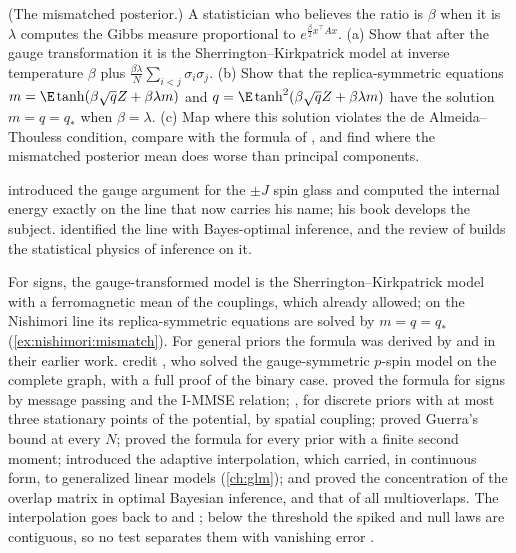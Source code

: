 \begin{refsection}
\begin{exercises}
\item \research (The mismatched posterior.) A statistician who believes the ratio is $\beta$ when it is $\lambda$ computes the Gibbs measure proportional to $e^{\frac\beta2x^\top Ax}$. (a) Show that after the gauge transformation it is the Sherrington--Kirkpatrick model at inverse temperature $\beta$ plus $\frac{\beta\lambda}N\sum_{i<j}\sigma_i\sigma_j$. (b) Show that the replica-symmetric equations $m=\E\tanh(\beta\sqrt qZ+\beta\lambda m)$ and $q=\E\tanh^2(\beta\sqrt qZ+\beta\lambda m)$ have the solution $m=q=q_*$ when $\beta=\lambda$. (c) Map where this solution violates the de Almeida--Thouless condition, compare with the formula of \textcite{Chen2014}, and find where the mismatched posterior mean does worse than principal components.\label{ex:nishimori:mismatch}
\end{exercises}

\notesandrefs
\textcite{Nishimori1981} introduced the gauge argument for the $\pm J$ spin glass and computed the internal energy exactly on the line that now carries his name; his book \parencite{Nishimori2001} develops the subject. \textcite{Iba1999} identified the line with Bayes-optimal inference, and the review of \textcite{ZdeborovaKrzakala2016} builds the statistical physics of inference on it.

For signs, the gauge-transformed model is the Sherrington--Kirkpatrick model with a ferromagnetic mean of the couplings, which \textcite{SherringtonKirkpatrick1975} already allowed; on the Nishimori line its replica-symmetric equations are solved by $m=q=q_*$ (\cref{ex:nishimori:mismatch}). For general priors the formula was derived by \textcite{LesieurKrzakalaZdeborova2017} and in their earlier work. \Textcite{BarbierMacris2019} credit \textcite{KoradaMacris2009}, who solved the gauge-symmetric $p$-spin model on the complete graph, with a full proof of the binary case. \Textcite{DeshpandeAbbeMontanari2016} proved the formula for signs by message passing and the I-MMSE relation; \textcite{BarbierEtAl2016}, for discrete priors with at most three stationary points of the potential, by spatial coupling; \textcite{KrzakalaXuZdeborova2016} proved Guerra's bound at every $N$; \textcite{LelargeMiolane2019} proved the formula for every prior with a finite second moment; \textcite{BarbierMacris2019} introduced the adaptive interpolation, which \textcite{BarbierEtAl2019} carried, in continuous form, to generalized linear models (\cref{ch:glm}); and \textcite{Barbier2021} proved the concentration of the overlap matrix in optimal Bayesian inference, and \textcite{BarbierPanchenko2022} that of all multioverlaps. The interpolation goes back to \textcite{GuerraToninelli2002} and \textcite{Guerra2003}; below the threshold the spiked and null laws are contiguous, so no test separates them with vanishing error \parencite{PerryEtAl2018,ElAlaouiKrzakalaJordan2020}.


\end{refsection}
